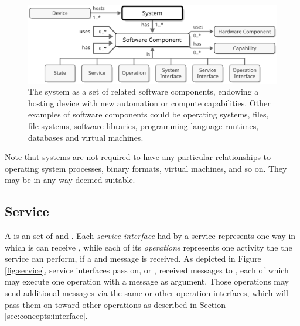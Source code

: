 \vfill

\begin{figure}[ht!]
  \centering
  \includegraphics[scale=0.9]{figures/system}
  \caption{
    The system as a set of related software components, endowing a hosting device with new automation or compute capabilities.
    Other examples of software components could be operating systems, files, file systems, software libraries, programming language runtimes, databases and virtual machines.
  }
  \label{fig:system}
\end{figure}

Note that systems are not required to have any particular relationships to operating system processes, binary formats, virtual machines, and so on.
They may be  in any way deemed suitable.

\subsection{Service}
\label{sec:concepts:service}

A  is an  set of  and .
Each \textit{service interface} had by a service represents one way in which is can receive , while each of its \textit{operations} represents one activity the   the service can perform, if a  and  message is received.
As depicted in Figure \ref{fig:service}, service interfaces pass on, or , received messages to , each of which may execute one operation with a message as argument.
Those operations may send additional messages via the same or other operation interfaces, which will pass them on toward other operations as described in Section \ref{sec:concepts:interface}.

